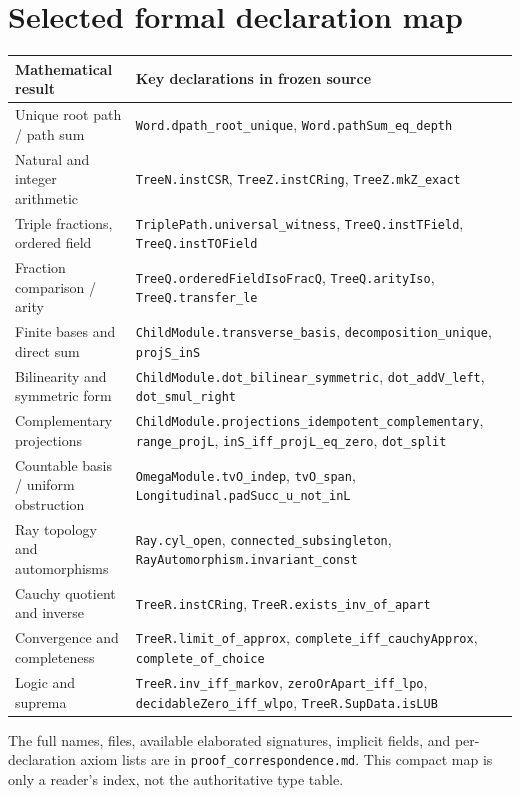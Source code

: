 \documentclass[11pt,reqno]{amsart}
\theoremstyle{definition}\newtheorem{definition}[theorem]{Definition}
\theoremstyle{remark}\newtheorem{remark}[theorem]{Remark}
\begin{document}
\clearpage
\section{Selected formal declaration map}\label{app:map}
\begin{center}\scriptsize
\begin{tabular}{@{}>{\raggedright\arraybackslash}p{}>{\raggedright\arraybackslash}p{}@{}}
Mathematical result & Key declarations in frozen source\\\hline
Unique root path / path sum & \texttt{Word.dpath\_root\_unique}, \texttt{Word.pathSum\_eq\_depth}\\
Natural and integer arithmetic & \texttt{TreeN.instCSR}, \texttt{TreeZ.instCRing}, \texttt{TreeZ.mkZ\_exact}\\
Triple fractions, ordered field & \texttt{TriplePath.universal\_witness}, \texttt{TreeQ.instTField}, \texttt{TreeQ.instTOField}\\
Fraction comparison / arity & \texttt{TreeQ.orderedFieldIsoFracQ}, \texttt{TreeQ.arityIso}, \texttt{TreeQ.transfer\_le}\\
Finite bases and direct sum & \texttt{ChildModule.transverse\_basis}, \texttt{decomposition\_unique}, \texttt{projS\_inS}\\
Bilinearity and symmetric form & \texttt{ChildModule.dot\_bilinear\_symmetric}, \texttt{dot\_addV\_left}, \texttt{dot\_smul\_right}\\
Complementary projections & \texttt{ChildModule.projections\_idempotent\_complementary}, \texttt{range\_projL}, \texttt{inS\_iff\_projL\_eq\_zero}, \texttt{dot\_split}\\
Countable basis / uniform obstruction & \texttt{OmegaModule.tvO\_indep}, \texttt{tvO\_span}, \texttt{Longitudinal.padSucc\_u\_not\_inL}\\
Ray topology and automorphisms & \texttt{Ray.cyl\_open}, \texttt{connected\_subsingleton}, \texttt{RayAutomorphism.invariant\_const}\\
Cauchy quotient and inverse & \texttt{TreeR.instCRing}, \texttt{TreeR.exists\_inv\_of\_apart}\\
Convergence and completeness & \texttt{TreeR.limit\_of\_approx}, \texttt{complete\_iff\_cauchyApprox}, \texttt{complete\_of\_choice}\\
Logic and suprema & \texttt{TreeR.inv\_iff\_markov}, \texttt{zeroOrApart\_iff\_lpo}, \texttt{decidableZero\_iff\_wlpo}, \texttt{TreeR.SupData.isLUB}\\
\end{tabular}
\end{center}
The full names, files, available elaborated signatures, implicit fields, and per-declaration axiom lists are in \texttt{proof\_correspondence.md}. This compact map is only a reader's index, not the authoritative type table.

\clearpage

\end{document}
